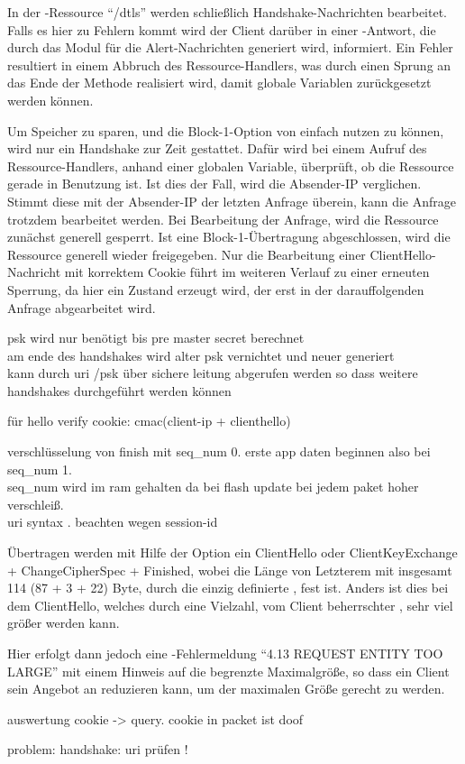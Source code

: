 In der -Ressource "`/dtls"' werden schließlich Handshake-Nachrichten bearbeitet. Falls es hier zu Fehlern kommt wird der Client darüber in einer
-Antwort, die durch das Modul für die Alert-Nachrichten generiert wird, informiert. Ein Fehler resultiert in einem Abbruch des Ressource-Handlers,
was durch einen Sprung an das Ende der Methode realisiert wird, damit globale Variablen zurückgesetzt werden können.

Um Speicher zu sparen, und die Block-1-Option von  einfach nutzen zu können, wird nur ein Handshake zur Zeit gestattet. Dafür wird bei einem Aufruf des
Ressource-Handlers, anhand einer globalen Variable, überprüft, ob die Ressource gerade in Benutzung ist. Ist dies der Fall, wird die Absender-IP verglichen.
Stimmt diese mit der Absender-IP der letzten Anfrage überein, kann die Anfrage trotzdem bearbeitet werden. Bei Bearbeitung der Anfrage, wird die Ressource
zunächst generell gesperrt. Ist eine Block-1-Übertragung abgeschlossen, wird die Ressource generell wieder freigegeben. Nur die Bearbeitung einer
ClientHello-Nachricht mit korrektem Cookie führt im weiteren Verlauf zu einer erneuten Sperrung, da hier ein Zustand erzeugt wird, der erst in der darauffolgenden
Anfrage abgearbeitet wird.  

psk wird nur benötigt bis pre master secret berechnet\\
am ende des handshakes wird alter psk vernichtet und neuer generiert\\
kann durch uri /psk über sichere leitung abgerufen werden so dass weitere handshakes durchgeführt werden können

für hello verify cookie: cmac(client-ip + clienthello)

verschlüsselung von finish mit seq\_num 0. erste app daten beginnen also bei seq\_num 1.\\
seq\_num wird im ram gehalten da bei flash update bei jedem paket hoher verschleiß.\\

uri syntax \cite{rfc3986}. beachten wegen session-id

Übertragen werden mit Hilfe der Option ein ClientHello oder ClientKeyExchange + ChangeCipherSpec + Finished, wobei die Länge von Letzterem mit
insgesamt 114 (87 + 3 + 22) Byte, durch die einzig definierte , fest ist. Anders ist dies bei dem ClientHello, welches durch
eine Vielzahl, vom Client beherrschter , sehr viel größer werden kann.

Hier erfolgt dann jedoch eine -Fehlermeldung "`4.13 REQUEST ENTITY TOO LARGE"' mit einem Hinweis auf die begrenzte Maximalgröße,
so dass ein Client sein Angebot an  reduzieren kann, um der maximalen Größe gerecht zu werden.

auswertung cookie -> query. cookie in packet ist doof

problem: handshake: uri prüfen !